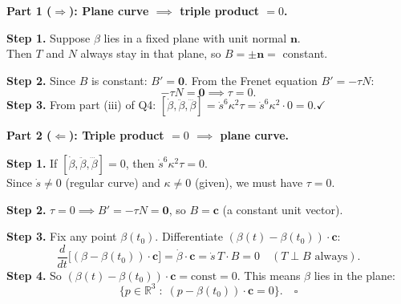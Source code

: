 \documentclass[12pt]{article}
\begin{document}
\begin{ansbox}
\textbf{Part 1 ($\Rightarrow$): Plane curve $\implies$ triple product $=0$.}

\textbf{Step 1.} Suppose $\beta$ lies in a fixed plane with unit normal $\mathbf{n}$.\\
Then $T$ and $N$ always stay in that plane, so $B=\pm\mathbf{n}=$ constant.

\textbf{Step 2.} Since $B$ is constant: $B'=\mathbf{0}$. From the Frenet equation $B'=-\tau N$:
\[
  -\tau N=\mathbf{0} \implies \tau=0.
\]
\textbf{Step 3.} From part (iii) of Q4: $[\dot\beta,\ddot\beta,\dddot\beta]=\dot s^6\kappa^2\tau=\dot s^6\kappa^2\cdot0=0$.\hfill$\checkmark$

\medskip
\textbf{Part 2 ($\Leftarrow$): Triple product $=0$ $\implies$ plane curve.}

\textbf{Step 1.} If $[\dot\beta,\ddot\beta,\dddot\beta]=0$, then $\dot s^6\kappa^2\tau=0$.\\
Since $\dot s\neq0$ (regular curve) and $\kappa\neq0$ (given), we must have $\tau=0$.

\textbf{Step 2.} $\tau=0 \implies B'=-\tau N=\mathbf{0}$, so $B=\mathbf{c}$ (a constant unit vector).

\textbf{Step 3.} Fix any point $\beta(t_0)$. Differentiate $(\beta(t)-\beta(t_0))\cdot\mathbf{c}$:
\[
  \frac{d}{dt}\bigl[(\beta-\beta(t_0))\cdot\mathbf{c}\bigr]=\dot\beta\cdot\mathbf{c}=\dot s\,T\cdot B=0
  \quad(T\perp B\text{ always}).
\]
\textbf{Step 4.} So $(\beta(t)-\beta(t_0))\cdot\mathbf{c}=\text{const}=0$. This means $\beta$ lies in the plane:
\[
  \{p\in\mathbb{R}^3\;:\;(p-\beta(t_0))\cdot\mathbf{c}=0\}.\quad\square
\]
\end{ansbox}
\end{document}
